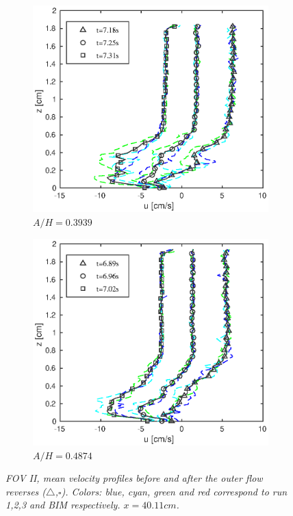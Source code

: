 \documentclass[a4paper, 11pt, english, twoside, openright]{article}
\begin{document}
\begin{figure}[]
{\begin{subfigure}[b]{.3\textwidth}
\centering
\includegraphics[width=.95\textwidth]{./Figures/FOV_4/case40_sept2015.eps}
\caption{\textit{$A/H=0.3939$}}
\end{subfigure}%
\begin{subfigure}[b]{.3\textwidth}
\centering
\includegraphics[width=.95\textwidth]{./Figures/FOV_4/case50_sept2015.eps}
\caption{\textit{$A/H=0.4874$}}
\end{subfigure}%
}
\caption{ \textit{FOV II, mean velocity profiles before  and after the outer flow reverses ($\triangle$,$\square$). Colors: blue, cyan, green and red correspond to run 1,2,3 and BIM respectively.  $x=40.11cm$. } }
\label{fig:PIV_FOV4}
\end{figure}
\end{document}
